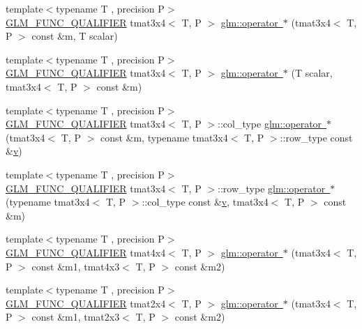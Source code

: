 \begin{DoxyCompactItemize}
\item 
{\footnotesize template$<$typename T , precision P$>$ }\\\mbox{\hyperlink{setup_8hpp_a33fdea6f91c5f834105f7415e2a64407}{G\+L\+M\+\_\+\+F\+U\+N\+C\+\_\+\+Q\+U\+A\+L\+I\+F\+I\+ER}} tmat3x4$<$ T, P $>$ \mbox{\hyperlink{namespaceglm_a5c29d387df8739c49ffdc4034097b9f5}{glm\+::operator $\ast$}} (tmat3x4$<$ T, P $>$ const \&m, T scalar)
\item 
{\footnotesize template$<$typename T , precision P$>$ }\\\mbox{\hyperlink{setup_8hpp_a33fdea6f91c5f834105f7415e2a64407}{G\+L\+M\+\_\+\+F\+U\+N\+C\+\_\+\+Q\+U\+A\+L\+I\+F\+I\+ER}} tmat3x4$<$ T, P $>$ \mbox{\hyperlink{namespaceglm_a0be5c9e67b9c6db77f823161db582997}{glm\+::operator $\ast$}} (T scalar, tmat3x4$<$ T, P $>$ const \&m)
\item 
{\footnotesize template$<$typename T , precision P$>$ }\\\mbox{\hyperlink{setup_8hpp_a33fdea6f91c5f834105f7415e2a64407}{G\+L\+M\+\_\+\+F\+U\+N\+C\+\_\+\+Q\+U\+A\+L\+I\+F\+I\+ER}} tmat3x4$<$ T, P $>$\+::col\+\_\+type \mbox{\hyperlink{namespaceglm_ab3691963644a0dc5bd52157e2c96e949}{glm\+::operator $\ast$}} (tmat3x4$<$ T, P $>$ const \&m, typename tmat3x4$<$ T, P $>$\+::row\+\_\+type const \&\mbox{\hyperlink{glad_8h_a14cfbe2fc2234f5504618905b69d1e06}{v}})
\item 
{\footnotesize template$<$typename T , precision P$>$ }\\\mbox{\hyperlink{setup_8hpp_a33fdea6f91c5f834105f7415e2a64407}{G\+L\+M\+\_\+\+F\+U\+N\+C\+\_\+\+Q\+U\+A\+L\+I\+F\+I\+ER}} tmat3x4$<$ T, P $>$\+::row\+\_\+type \mbox{\hyperlink{namespaceglm_a3659df6ca1633737dbc87404ded0a37b}{glm\+::operator $\ast$}} (typename tmat3x4$<$ T, P $>$\+::col\+\_\+type const \&\mbox{\hyperlink{glad_8h_a14cfbe2fc2234f5504618905b69d1e06}{v}}, tmat3x4$<$ T, P $>$ const \&m)
\item 
{\footnotesize template$<$typename T , precision P$>$ }\\\mbox{\hyperlink{setup_8hpp_a33fdea6f91c5f834105f7415e2a64407}{G\+L\+M\+\_\+\+F\+U\+N\+C\+\_\+\+Q\+U\+A\+L\+I\+F\+I\+ER}} tmat4x4$<$ T, P $>$ \mbox{\hyperlink{namespaceglm_a538319dc1553a01d320a9bf699a11933}{glm\+::operator $\ast$}} (tmat3x4$<$ T, P $>$ const \&m1, tmat4x3$<$ T, P $>$ const \&m2)
\item 
{\footnotesize template$<$typename T , precision P$>$ }\\\mbox{\hyperlink{setup_8hpp_a33fdea6f91c5f834105f7415e2a64407}{G\+L\+M\+\_\+\+F\+U\+N\+C\+\_\+\+Q\+U\+A\+L\+I\+F\+I\+ER}} tmat2x4$<$ T, P $>$ \mbox{\hyperlink{namespaceglm_a697536fdc5acff4d41184cea42b902b6}{glm\+::operator $\ast$}} (tmat3x4$<$ T, P $>$ const \&m1, tmat2x3$<$ T, P $>$ const \&m2)

\end{DoxyCompactItemize}
